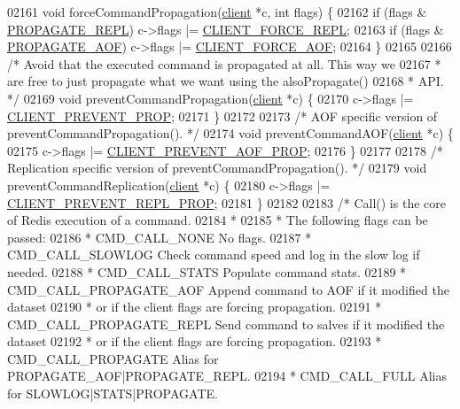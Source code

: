 \begin{DoxyCode}
{{{{{{{{{{{{{{{{{{{{{{{{{{{{{02161 \textcolor{keywordtype}{void} forceCommandPropagation(\hyperlink{structclient}{client} *c, \textcolor{keywordtype}{int} flags) \{
02162     \textcolor{keywordflow}{if} (flags & \hyperlink{server_8h_a59c6e025b4ed85642a0472fc3e73e298}{PROPAGATE\_REPL}) c->flags |= \hyperlink{server_8h_a9f89484284fb0956374bd7b6fa639602}{CLIENT\_FORCE\_REPL};
02163     \textcolor{keywordflow}{if} (flags & \hyperlink{server_8h_a542fb79924ca427c866fd63632f60777}{PROPAGATE\_AOF}) c->flags |= \hyperlink{server_8h_a451c1542a74f0181600d043df3f1b19a}{CLIENT\_FORCE\_AOF};
02164 \}
02165 
02166 \textcolor{comment}{/* Avoid that the executed command is propagated at all. This way we}
02167 \textcolor{comment}{ * are free to just propagate what we want using the alsoPropagate()}
02168 \textcolor{comment}{ * API. */}
02169 \textcolor{keywordtype}{void} preventCommandPropagation(\hyperlink{structclient}{client} *c) \{
02170     c->flags |= \hyperlink{server_8h_aea3bfee2e140aed0fc93bf087026f9a3}{CLIENT\_PREVENT\_PROP};
02171 \}
02172 
02173 \textcolor{comment}{/* AOF specific version of preventCommandPropagation(). */}
02174 \textcolor{keywordtype}{void} preventCommandAOF(\hyperlink{structclient}{client} *c) \{
02175     c->flags |= \hyperlink{server_8h_a9948ae3a2778b5a06b704231b921e7fa}{CLIENT\_PREVENT\_AOF\_PROP};
02176 \}
02177 
02178 \textcolor{comment}{/* Replication specific version of preventCommandPropagation(). */}
02179 \textcolor{keywordtype}{void} preventCommandReplication(\hyperlink{structclient}{client} *c) \{
02180     c->flags |= \hyperlink{server_8h_a01c18c16bc758787b5cfc287eb7b089e}{CLIENT\_PREVENT\_REPL\_PROP};
02181 \}
02182 
02183 \textcolor{comment}{/* Call() is the core of Redis execution of a command.}
02184 \textcolor{comment}{ *}
02185 \textcolor{comment}{ * The following flags can be passed:}
02186 \textcolor{comment}{ * CMD\_CALL\_NONE        No flags.}
02187 \textcolor{comment}{ * CMD\_CALL\_SLOWLOG     Check command speed and log in the slow log if needed.}
02188 \textcolor{comment}{ * CMD\_CALL\_STATS       Populate command stats.}
02189 \textcolor{comment}{ * CMD\_CALL\_PROPAGATE\_AOF   Append command to AOF if it modified the dataset}
02190 \textcolor{comment}{ *                          or if the client flags are forcing propagation.}
02191 \textcolor{comment}{ * CMD\_CALL\_PROPAGATE\_REPL  Send command to salves if it modified the dataset}
02192 \textcolor{comment}{ *                          or if the client flags are forcing propagation.}
02193 \textcolor{comment}{ * CMD\_CALL\_PROPAGATE   Alias for PROPAGATE\_AOF|PROPAGATE\_REPL.}
02194 \textcolor{comment}{ * CMD\_CALL\_FULL        Alias for SLOWLOG|STATS|PROPAGATE.}
}}}}}}}}}}}}}}}}}}}}}}}}}}}}}
\end{DoxyCode}
